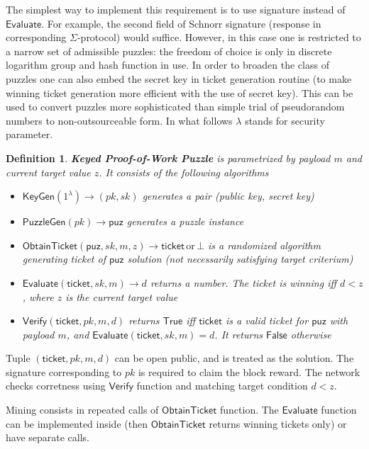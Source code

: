 \documentclass[]{article}
\newcommand{\Ticket}{\mathsf{ticket}}
\newcommand{\KeyGen}{\mathsf{KeyGen}}
\newcommand{\PuzzleGen}{\mathsf{PuzzleGen}}
\newcommand{\Eval}{\mathsf{Evaluate}}
\newcommand{\Verify}{\mathsf{Verify}}
\newcommand{\ObtainTicket}{\mathsf{ObtainTicket}}
\newtheorem{definition}{Definition}
\begin{document}
    The simplest way to implement this requirement is to use signature instead
    of $\Eval$. For example, the second field of Schnorr signature (response in
    corresponding $\Sigma$-protocol) would suffice. However, in this case one is
    restricted to a narrow set of admissible puzzles: the freedom of choice is
    only in discrete logarithm group and hash function in use. In order to
    broaden the class of puzzles one can also embed the secret key in ticket
    generation routine (to make winning ticket generation more efficient with
    the use of secret key). This can be used to convert puzzles more sophisticated
    than simple trial of pseudorandom numbers to non-outsourceable form. In what
    follows $\lambda$ stands for security parameter.
    \begin{definition}
        {\bf Keyed Proof-of-Work Puzzle} is parametrized by payload $m$ and
        current target value $z$. It consists of the following algorithms
        \begin{itemize}
            \item $\KeyGen(1^\lambda)\rightarrow (pk,sk)$ generates a pair (public key,
                secret key)
            \item $\PuzzleGen(pk)\rightarrow \mathsf{puz}$ generates a puzzle instance
            \item
                $\ObtainTicket(\mathsf{puz},sk,m,z)\rightarrow\Ticket \,
                \mathrm{or}\,\bot$
                is a randomized algorithm generating ticket of 
                $\mathsf{puz}$ solution (not necessarily satisfying target
                criterium)
            \item $\Eval(\Ticket,sk,m)\rightarrow d$
                returns a number. The ticket is winning iff $d<z$, where $z$
                is the current target value
            \item $\Verify(\Ticket,pk,m,d)$ returns $\mathsf{True}$ iff
                $\Ticket$ is a valid ticket for $\mathsf{puz}$ with payload $m$,
                and $\Eval(\Ticket,sk,m)=d$. It returns $\mathsf{False}$
                otherwise
        \end{itemize}
    \end{definition}
    Tuple $(\Ticket, pk, m, d)$ can be open public, and is treated as the
    solution. The signature corresponding to $pk$ is required to claim the block
    reward. The network checks corretness using $\Verify$ function and matching
    target condition $d<z$.

    Mining consists in repeated calls of $\ObtainTicket$ function.
    The $\Eval$ function can be implemented inside (then $\ObtainTicket$
    returns winning tickets only) or have separate calls.
\end{document}
